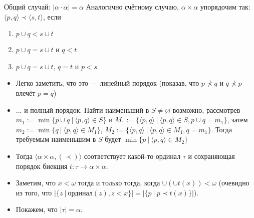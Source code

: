 \documentclass[aspectratio=169]{beamer}
\begin{document}
\begin{frame}{Общий случай: $|\alpha \cdot \alpha| = \alpha$}
Аналогично счётному случаю, $\alpha \times \alpha$ упорядочим так: $\langle p,q \rangle \prec \langle s,t \rangle$,
если \begin{enumerate}
\item $p \cup q < s \cup t$
\item $p \cup q = s \cup t$ и $q < t$
\item $p \cup q = s \cup t$, $q = t$ и $p < s$
\end{enumerate}
\begin{itemize}
\item Легко заметить, что это --- линейный порядок (показав, что $p \not\prec q$ и $q \not\prec p$ влечёт $p = q$)
\item ... и полный порядок. Найти наименьший в $S \ne \varnothing$ возможно, рассмотрев $m_1 := \min \{ p \cup q\ |\ \langle p,q \rangle \in S\}$ и
$M_1 := \{ \langle p,q\rangle\ |\ \langle p,q \rangle \in S, p \cup q = m_1\}$,
затем $m_2 := \min \{q\ |\ \langle p,q \rangle \in M_1 \}$,
$M_2 := \{\langle p,q\rangle\ |\ \langle p,q \rangle \in M_1, q = m_1\}$.
Тогда требуемым наименьшим в $S$ будет $\min \{ p\ |\ \langle p,q \rangle \in M_2\}$
\item Тогда $\langle \alpha\times\alpha, (\prec)\rangle$ соответствует какой-то ординал $\tau$ 
и сохраняющая порядок биекция $t: \tau\rightarrow\alpha\times\alpha$. 
\item Заметим, что $x < \omega$ тогда и только тогда, когда $\cup(\cup t(x)) < \omega$
(очевидно из того, что $|\{z\ |\ \text{ординал}(z), z < x\}|=|\{p\ |\ p \prec t(x)\}|$).
\item Покажем, что $|\tau| = \alpha$.
\end{itemize}
\end{frame}
\end{document}

